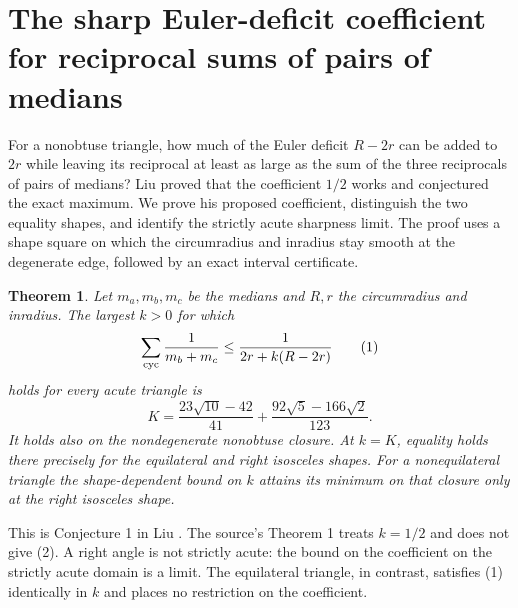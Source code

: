 \documentclass[11pt,a4paper]{article}
\numberwithin{equation}{section}
\newtheorem{theorem}{Theorem}[section]
\theoremstyle{definition}
\theoremstyle{remark}
\newenvironment{sectionabstract}{\par\smallskip\begingroup\small\noindent}{\par\endgroup\medskip}
\begin{document}
\par\endgroup

\begingroup
\newcommand{\cyc}{\mathop{\sum_{\rm cyc}}}
\section{\texorpdfstring{The sharp Euler-deficit coefficient for reciprocal sums of pairs of medians}{The sharp Euler-deficit coefficient for reciprocal sums of pairs of medians}}\label{section:r37meiji}
\par\medskip


\begin{sectionabstract}
For a nonobtuse triangle, how much of the Euler deficit $R-2r$ can be added to $2r$ while leaving its reciprocal at least as large as the sum of the three reciprocals of pairs of medians? Liu proved that the coefficient $1/2$ works and conjectured the exact maximum. We prove his proposed coefficient, distinguish the two equality shapes, and identify the strictly acute sharpness limit. The proof uses a shape square on which the circumradius and inradius stay smooth at the degenerate edge, followed by an exact interval certificate.
\end{sectionabstract}
\begin{theorem}
Let $m_a,m_b,m_c$ be the medians and $R,r$ the circumradius and inradius. The largest $k>0$ for which
\[
 \cyc\frac1{m_b+m_c}\le \frac1{2r+k(R-2r)}
 \tag{1}
\]
holds for every acute triangle is
\[
 K=\frac{23\sqrt{10}-42}{41}+\frac{92\sqrt5-166\sqrt2}{123}.
 \tag{2}
\]
It holds also on the nondegenerate nonobtuse closure. At $k=K$, equality holds there precisely for the equilateral and right isosceles shapes. For a nonequilateral triangle the shape-dependent bound on $k$ attains its minimum on that closure only at the right isosceles shape.
\end{theorem}

This is Conjecture 1 in Liu \cite[p.~20, (4.1)]{r37meiji:liu}. The source's Theorem 1 treats $k=1/2$ and does not give (2). A right angle is not strictly acute: the bound on the coefficient on the strictly acute domain is a limit. The equilateral triangle, in contrast, satisfies (1) identically in $k$ and places no restriction on the coefficient.
\end{document}
